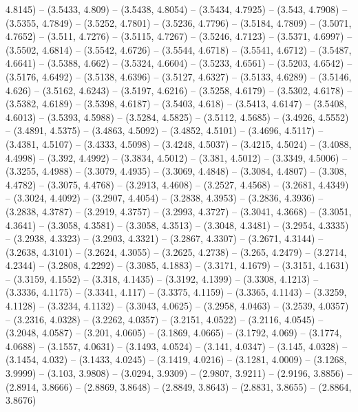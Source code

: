 {   4.8145) -- (3.5433, 4.809) -- (3.5438, 4.8054) -- (3.5434, 4.7925) -- (3.543,
   4.7908) -- (3.5355, 4.7849) -- (3.5252, 4.7801) -- (3.5236, 4.7796) -- 
  (3.5184, 4.7809) -- (3.5071, 4.7652) -- (3.511, 4.7276) -- (3.5115, 4.7267) --
   (3.5246, 4.7123) -- (3.5371, 4.6997) -- (3.5502, 4.6814) -- (3.5542, 4.6726) 
  -- (3.5544, 4.6718) -- (3.5541, 4.6712) -- (3.5487, 4.6641) -- (3.5388, 4.662)
   -- (3.5324, 4.6604) -- (3.5233, 4.6561) -- (3.5203, 4.6542) -- (3.5176, 
  4.6492) -- (3.5138, 4.6396) -- (3.5127, 4.6327) -- (3.5133, 4.6289) -- 
  (3.5146, 4.626) -- (3.5162, 4.6243) -- (3.5197, 4.6216) -- (3.5258, 4.6179) --
   (3.5302, 4.6178) -- (3.5382, 4.6189) -- (3.5398, 4.6187) -- (3.5403, 4.618) 
  -- (3.5413, 4.6147) -- (3.5408, 4.6013) -- (3.5393, 4.5988) -- (3.5284, 
  4.5825) -- (3.5112, 4.5685) -- (3.4926, 4.5552) -- (3.4891, 4.5375) -- 
  (3.4863, 4.5092) -- (3.4852, 4.5101) -- (3.4696, 4.5117) -- (3.4381, 4.5107) 
  -- (3.4333, 4.5098) -- (3.4248, 4.5037) -- (3.4215, 4.5024) -- (3.4088, 
  4.4998) -- (3.392, 4.4992) -- (3.3834, 4.5012) -- (3.381, 4.5012) -- (3.3349, 
  4.5006) -- (3.3255, 4.4988) -- (3.3079, 4.4935) -- (3.3069, 4.4848) -- 
  (3.3084, 4.4807) -- (3.308, 4.4782) -- (3.3075, 4.4768) -- (3.2913, 4.4608) --
   (3.2527, 4.4568) -- (3.2681, 4.4349) -- (3.3024, 4.4092) -- (3.2907, 4.4054) 
  -- (3.2838, 4.3953) -- (3.2836, 4.3936) -- (3.2838, 4.3787) -- (3.2919, 
  4.3757) -- (3.2993, 4.3727) -- (3.3041, 4.3668) -- (3.3051, 4.3641) -- 
  (3.3058, 4.3581) -- (3.3058, 4.3513) -- (3.3048, 4.3481) -- (3.2954, 4.3335) 
  -- (3.2938, 4.3323) -- (3.2903, 4.3321) -- (3.2867, 4.3307) -- (3.2671, 
  4.3144) -- (3.2638, 4.3101) -- (3.2624, 4.3055) -- (3.2625, 4.2738) -- (3.265,
   4.2479) -- (3.2714, 4.2344) -- (3.2808, 4.2292) -- (3.3085, 4.1883) -- 
  (3.3171, 4.1679) -- (3.3151, 4.1631) -- (3.3159, 4.1552) -- (3.318, 4.1435) --
   (3.3192, 4.1399) -- (3.3308, 4.1213) -- (3.3336, 4.1175) -- (3.3341, 4.117) 
  -- (3.3375, 4.1159) -- (3.3365, 4.1143) -- (3.3259, 4.1128) -- (3.3234, 
  4.1132) -- (3.3043, 4.0625) -- (3.2958, 4.0463) -- (3.2539, 4.0357) -- 
  (3.2316, 4.0328) -- (3.2262, 4.0357) -- (3.2151, 4.0522) -- (3.2116, 4.0545) 
  -- (3.2048, 4.0587) -- (3.201, 4.0605) -- (3.1869, 4.0665) -- (3.1792, 4.069) 
  -- (3.1774, 4.0688) -- (3.1557, 4.0631) -- (3.1493, 4.0524) -- (3.141, 4.0347)
   -- (3.145, 4.0328) -- (3.1454, 4.032) -- (3.1433, 4.0245) -- (3.1419, 4.0216)
   -- (3.1281, 4.0009) -- (3.1268, 3.9999) -- (3.103, 3.9808) -- (3.0294, 
  3.9309) -- (2.9807, 3.9211) -- (2.9196, 3.8856) -- (2.8914, 3.8666) -- 
  (2.8869, 3.8648) -- (2.8849, 3.8643) -- (2.8831, 3.8655) -- (2.8864, 3.8676) 
}
